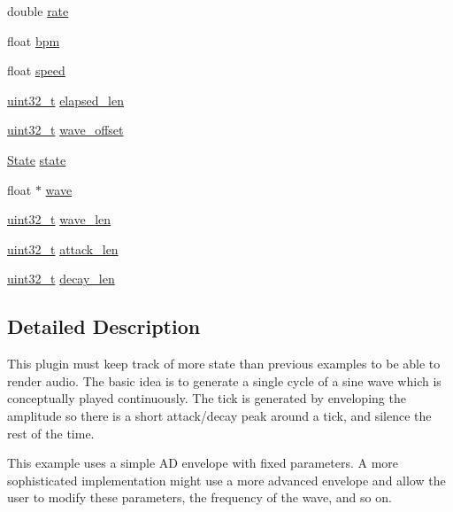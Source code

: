 \begin{DoxyCompactItemize}
\begin{tabbing}
\end{tabbing}\item 
double \hyperlink{struct_metro_a8357844df6655d12ff781a3549e45dce}{rate}
\item 
float \hyperlink{struct_metro_a67f939426c3147f0a45f92b72f11335a}{bpm}
\item 
float \hyperlink{struct_metro_a761e25a27910e7725b3ff3015387251f}{speed}
\item 
\hyperlink{lib-src_2ffmpeg_2win32_2stdint_8h_a6eb1e68cc391dd753bc8ce896dbb8315}{uint32\+\_\+t} \hyperlink{struct_metro_a40198227cd12fb39b20c97eed3ec2f89}{elapsed\+\_\+len}
\item 
\hyperlink{lib-src_2ffmpeg_2win32_2stdint_8h_a6eb1e68cc391dd753bc8ce896dbb8315}{uint32\+\_\+t} \hyperlink{struct_metro_a53078e04d9ead20fb23a24f48d9f5139}{wave\+\_\+offset}
\item 
\hyperlink{struct_state}{State} \hyperlink{struct_metro_aa21e79985e7fe176b8fcbbfe4f3102bf}{state}
\item 
float $\ast$ \hyperlink{struct_metro_a42515e404bb842cfb7c3e533e5ff380a}{wave}
\item 
\hyperlink{lib-src_2ffmpeg_2win32_2stdint_8h_a6eb1e68cc391dd753bc8ce896dbb8315}{uint32\+\_\+t} \hyperlink{struct_metro_af1d13cb6f02c620ee7e9647ac78bc04a}{wave\+\_\+len}
\item 
\hyperlink{lib-src_2ffmpeg_2win32_2stdint_8h_a6eb1e68cc391dd753bc8ce896dbb8315}{uint32\+\_\+t} \hyperlink{struct_metro_a08b7dc8a36da651e3b9997f3042922bd}{attack\+\_\+len}
\item 
\hyperlink{lib-src_2ffmpeg_2win32_2stdint_8h_a6eb1e68cc391dd753bc8ce896dbb8315}{uint32\+\_\+t} \hyperlink{struct_metro_a728fc0ac8d1460597a2291fde05175fb}{decay\+\_\+len}
\end{DoxyCompactItemize}


\subsection{Detailed Description}
This plugin must keep track of more state than previous examples to be able to render audio. The basic idea is to generate a single cycle of a sine wave which is conceptually played continuously. The \textquotesingle{}tick\textquotesingle{} is generated by enveloping the amplitude so there is a short attack/decay peak around a tick, and silence the rest of the time.

This example uses a simple AD envelope with fixed parameters. A more sophisticated implementation might use a more advanced envelope and allow the user to modify these parameters, the frequency of the wave, and so on. 

